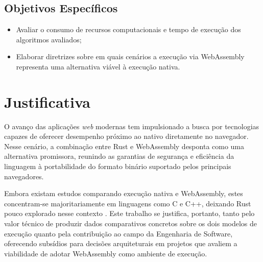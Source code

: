 \subsection {Objetivos Específicos}

\begin{itemize}
    \item Avaliar o consumo de recursos computacionais e tempo de execução dos algoritmos avaliados;
    \item Elaborar diretrizes sobre em quais cenários a execução via WebAssembly representa uma alternativa viável à execução nativa.
\end{itemize}

\section{Justificativa}

O avanço das aplicações \emph{web} modernas tem impulsionado a busca por tecnologias capazes de oferecer desempenho próximo ao nativo diretamente no navegador. Nesse cenário, a combinação entre Rust e WebAssembly desponta como uma alternativa promissora, reunindo as garantias de segurança e eficiência da linguagem à portabilidade do formato binário suportado pelos principais navegadores.

Embora existam estudos comparando execução nativa e WebAssembly, estes concentram-se majoritariamente em linguagens como C e C++, deixando Rust pouco explorado nesse contexto \cite{jangda2019}. Este trabalho se justifica, portanto, tanto pelo valor técnico de produzir dados comparativos concretos sobre os dois modelos de execução quanto pela contribuição ao campo da Engenharia de Software, oferecendo subsídios para decisões arquiteturais em projetos que avaliem a viabilidade de adotar WebAssembly como ambiente de execução.